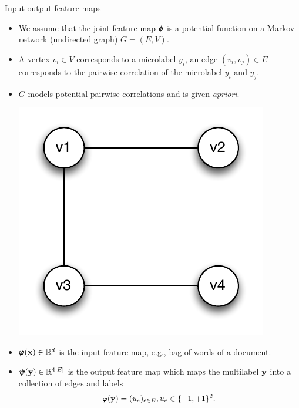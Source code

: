 \documentclass[first=dgreen,second=purple,logo=yellowexc]{aaltoslides}
\begin{document}
%
\begin{frame}{Input-output feature maps}
	\begin{itemize}\footnotesize
		\item We assume that the joint feature map $\pmb \phi$ is a potential function on a Markov network (undirected graph) $G=(E,V)$.
		\item A vertex $v_i\in V$ corresponds to a microlabel $y_i$, an edge $(v_i,v_j)\in E$ corresponds to the pairwise correlation of the microlabel $y_i$ and $y_j$.
		\item $G$ models potential pairwise correlations and is given {\em apriori}.
		\begin{center}
			\includegraphics[scale=0.3]{./figures/outputgraph.pdf}
		\end{center}
		\item $\pmb \varphi(\mathbf {x})\in\mathbb{R}^d$ is the input feature map, e.g., bag-of-words of a document.
		\item $\pmb \psi(\mathbf {y})\in\mathbb{R}^{4|E|}$ is the output feature map which maps the multilabel $\mathbf {y}$ into a collection of edges and labels
		\begin{align*}\footnotesize
			\pmb \varphi(\mathbf {y}) = (u_{e})_{e\in E},u_e\in\{-1,+1\}^2.
		\end{align*}
	\end{itemize}
\end{frame}
\end{document}
